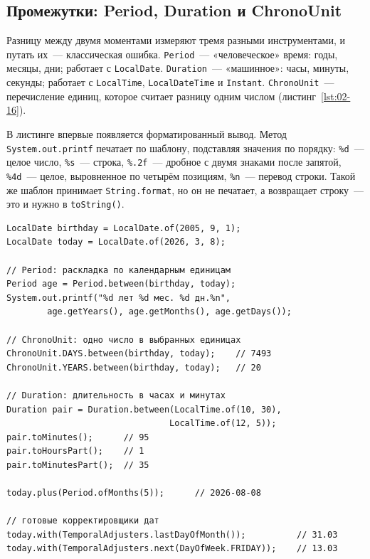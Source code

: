 \subsection{Промежутки: Period, Duration и ChronoUnit}

Разницу между двумя моментами измеряют тремя разными инструментами, и путать
их~--- классическая ошибка. \texttt{Period}~--- «человеческое» время: годы,
месяцы, дни; работает с \texttt{LocalDate}. \texttt{Duration}~--- «машинное»:
часы, минуты, секунды; работает с \texttt{LocalTime},
\texttt{LocalDateTime} и \texttt{Instant}. \texttt{ChronoUnit}~---
перечисление единиц, которое считает разницу одним числом
(листинг~\ref{lst:02-16}).

В листинге впервые появляется форматированный вывод. Метод
\texttt{System.out.printf} печатает по шаблону, подставляя значения по порядку:
\texttt{\%d}~--- целое число, \texttt{\%s}~--- строка, \texttt{\%.2f}~---
дробное с двумя знаками после запятой, \texttt{\%4d}~--- целое, выровненное по
четырём позициям, \texttt{\%n}~--- перевод строки. Такой же шаблон принимает
\texttt{String.format}, но он не печатает, а возвращает строку~--- это и нужно
в \texttt{toString()}.

\begin{listing}[H]
\begin{verbatim}
LocalDate birthday = LocalDate.of(2005, 9, 1);
LocalDate today = LocalDate.of(2026, 3, 8);

// Period: раскладка по календарным единицам
Period age = Period.between(birthday, today);
System.out.printf("%d лет %d мес. %d дн.%n",
        age.getYears(), age.getMonths(), age.getDays());

// ChronoUnit: одно число в выбранных единицах
ChronoUnit.DAYS.between(birthday, today);    // 7493
ChronoUnit.YEARS.between(birthday, today);   // 20

// Duration: длительность в часах и минутах
Duration pair = Duration.between(LocalTime.of(10, 30),
                                LocalTime.of(12, 5));
pair.toMinutes();      // 95
pair.toHoursPart();    // 1
pair.toMinutesPart();  // 35

today.plus(Period.ofMonths(5));      // 2026-08-08

// готовые корректировщики дат
today.with(TemporalAdjusters.lastDayOfMonth());          // 31.03
today.with(TemporalAdjusters.next(DayOfWeek.FRIDAY));    // 13.03
\end{verbatim}
\caption{Три способа измерить промежуток времени}
\label{lst:02-16}
\end{listing}

